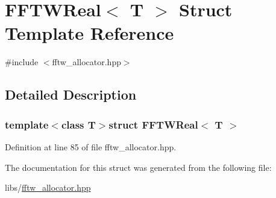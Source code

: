 \hypertarget{struct_f_f_t_w_real}{\section{F\-F\-T\-W\-Real$<$ T $>$ Struct Template Reference}
\label{struct_f_f_t_w_real}
}


{\ttfamily \#include $<$fftw\-\_\-allocator.\-hpp$>$}



\subsection{Detailed Description}
\subsubsection*{template$<$class T$>$struct F\-F\-T\-W\-Real$<$ T $>$}



Definition at line 85 of file fftw\-\_\-allocator.\-hpp.



The documentation for this struct was generated from the following file\-:\begin{DoxyCompactItemize}
\item 
libs/\hyperlink{fftw__allocator_8hpp}{fftw\-\_\-allocator.\-hpp}\end{DoxyCompactItemize}
